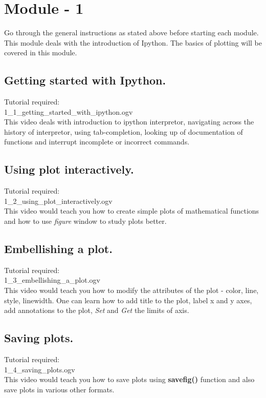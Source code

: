 \documentclass[11pt,twocolumn]{article}
\begin{document}
\section{Module - 1}
Go through the general instructions as stated above before starting each module. \\
  This module deals with the introduction of Ipython. The basics of plotting will be covered in this module.
  \subsection{Getting started with Ipython.}
    Tutorial required: \\ 1\_1\_getting\_started\_with\_ipython.ogv \\ 
    This video deals with introduction to ipython interpretor, navigating across the history of interpretor, using tab-completion, looking up of documentation of functions and interrupt incomplete or incorrect commands.

 
    \subsection{Using plot interactively.}
   Tutorial required: \\ 1\_2\_using\_plot\_interactively.ogv \\
    This video would teach you how to create simple plots of mathematical functions and how to use \emph{figure} window to study plots better. 

    \subsection{Embellishing a plot.}
    Tutorial required:\\ 1\_3\_embellishing\_a\_plot.ogv \\
      This video would teach you how to modify the attributes of the plot - color, line, style, linewidth. One can learn how to add title to the plot, label x and y axes, add annotations to the plot, \emph{Set} and \emph{Get} the limits of axis.

    \subsection{Saving plots.}
    Tutorial required: \\ 1\_4\_saving\_plots.ogv \\
    
      This video would teach you how to save plots using \textbf{savefig()} function and also save plots in various other formats.
\end{document}
